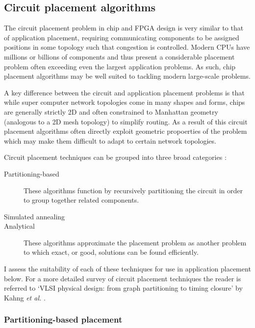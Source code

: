 		\subsection{Circuit placement algorithms}
			
			The circuit placement problem in chip and FPGA design is very similar to
			that of application placement, requiring communicating components to be
			assigned positions in some topology such that congestion is controlled.
			Modern CPUs have millions or billions of components and thus present a
			considerable placement problem often exceeding even the largest
			application problems. As such, chip placement algorithms may be well
			suited to tackling modern large-scale problems.
			
			A key difference between the circuit and application placement problems
			is that while super computer network topologies come in many shapes and
			forms, chips are generally strictly 2D and often constrained to Manhattan
			geometry (analogous to a 2D mesh topology) to simplify routing. As a
			result of this circuit placement algorithms often directly exploit
			geometric propoerties of the problem which may make them difficult to
			adapt to certain network topologies.
			
			Circuit placement techniques can be grouped into three broad categories
			\cite{kahng11}:
			
			\begin{description}
				
				\item[Partitioning-based] These algorithms function by recursively
				partitioning the circuit in order to group together related components.
				
				\item[Simulated annealing]
				
				\item[Analytical] These algorithms approximate the placement problem as
				another problem to which exact, or good, solutions can be found
				efficiently.
				
			\end{description}
			
			I assess the suitability of each of these techniques for use in
			application placement below. For a more detailed survey of circuit
			placement techniques the reader is referred to `VLSI physical design:
			from graph partitioning to timing closure' by Kahng \emph{et al.}
			\cite{kahng11}.
			
			\subsubsection{Partitioning-based placement}
				
